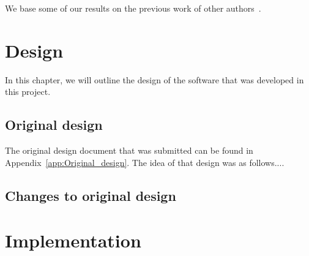 \documentclass[a4paper,11pt]{report}
\begin{document}
We base some of our results on the previous work of other authors~\cite{A1, Someone}.



\chapter{Design}\label{chap:design}

In this chapter, we will outline the design of the software that was
developed in this project.  

\section{Original design}\label{chap:first_design}
The original design document that was submitted can be found in 
Appendix~\ref{app:Original_design}.  The idea of that design
was as follows....


\section{Changes to original design}



\chapter{Implementation}\label{chap:implementation}
\end{document}
